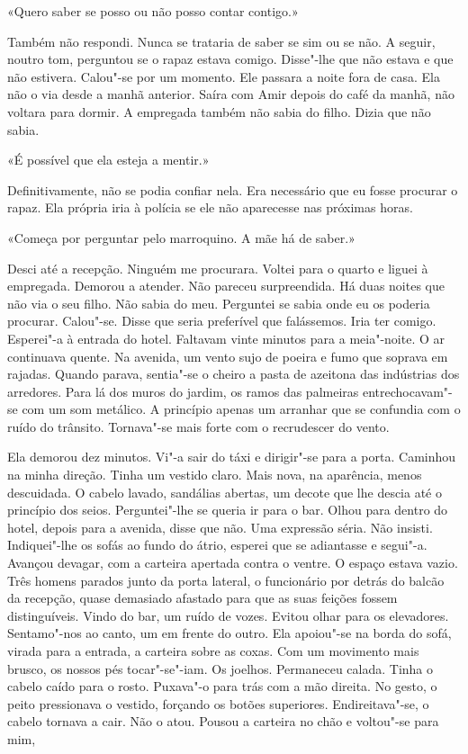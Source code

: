 «Quero saber se posso ou não posso contar contigo.»

Também não respondi. Nunca se trataria de saber se sim ou se não. A
seguir, noutro tom, perguntou se o rapaz estava comigo. Disse"-lhe que
não estava e que não estivera. Calou"-se por um momento. Ele passara a
noite fora de casa. Ela não o via desde a manhã anterior. Saíra com Amir
depois do café da manhã, não voltara para dormir. A empregada também
não sabia do filho. Dizia que não sabia.

«É possível que ela esteja a mentir.»

Definitivamente, não se podia confiar nela. Era necessário que eu fosse
procurar o rapaz. Ela própria iria à polícia se ele não aparecesse nas
próximas horas.

«Começa por perguntar pelo marroquino. A mãe há de saber.»

Desci até a recepção. Ninguém me procurara. Voltei para o quarto e
liguei à empregada. Demorou a atender. Não pareceu surpreendida. Há duas
noites que não via o seu filho. Não sabia do meu. Perguntei se sabia
onde eu os poderia procurar. Calou"-se. Disse que seria preferível que
falássemos. Iria ter comigo. Esperei"-a à entrada do hotel. Faltavam
vinte minutos para a meia"-noite. O ar continuava quente. Na avenida, um
vento sujo de poeira e fumo que soprava em rajadas. Quando parava,
sentia"-se o cheiro a pasta de azeitona das indústrias dos arredores.
Para lá dos muros do jardim, os ramos das palmeiras entrechocavam"-se
com um som metálico. A princípio apenas um arranhar que se confundia com
o ruído do trânsito. Tornava"-se mais forte com o recrudescer do vento.

Ela demorou dez minutos. Vi"-a sair do táxi e dirigir"-se para a porta.
Caminhou na minha direção. Tinha um vestido claro. Mais nova, na
aparência, menos descuidada. O cabelo lavado, sandálias abertas, um
decote que lhe descia até o princípio dos seios. Perguntei"-lhe se
queria ir para o bar. Olhou para dentro do hotel, depois para a avenida,
disse que não. Uma expressão séria. Não insisti. Indiquei"-lhe os sofás
ao fundo do átrio, esperei que se adiantasse e segui"-a. Avançou
devagar, com a carteira apertada contra o ventre. O espaço estava vazio.
Três homens parados junto da porta lateral, o funcionário por detrás do
balcão da recepção, quase demasiado afastado para que as suas feições
fossem distinguíveis. Vindo do bar, um ruído de vozes. Evitou olhar para
os elevadores. Sentamo"-nos ao canto, um em frente do outro. Ela
apoiou"-se na borda do sofá, virada para a entrada, a carteira sobre as
coxas. Com um movimento mais brusco, os nossos pés tocar"-se"-iam. Os
joelhos. Permaneceu calada. Tinha o cabelo caído para o rosto. Puxava"-o
para trás com a mão direita. No gesto, o peito pressionava o vestido,
forçando os botões superiores. Endireitava"-se, o cabelo tornava a cair.
Não o atou. Pousou a carteira no chão e voltou"-se para mim,

